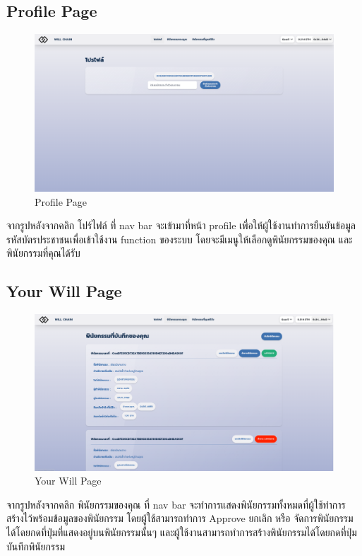 \documentclass[12pt,oneside,openright,a4paper]{cpe-thai-project}
\begin{document}
\subsection{Profile Page}
	\begin{figure}[!thb]
			\centering
			\includegraphics[scale=0.2]{Profile4}
			\caption{Profile Page}
		\end{figure}
		\FloatBarrier
\tab จากรูปหลังจากคลิก โปร์ไฟล์ ที่ nav bar จะเข้ามาที่หน้า profile เพื่อให้ผู้ใช้งานทำการยืนยันข้อมูลรหัสบัตรประชาชนเพื่อเข้าใช้งาน function ของระบบ โดยจะมีเมนูให้เลือกดูพินัยกรรมของคุณ และ พินัยกรรมที่คุณได้รับ
\subsection{Your Will Page }
	\begin{figure}[!thb]
			\centering
			\includegraphics[scale=0.2]{myWill4}
			\caption{Your Will Page}
		\end{figure}
		\FloatBarrier
\tab จากรูปหลังจากคลิก พินัยกรรมของคุณ ที่ nav bar จะทำการแสดงพินัยกรรมทั้งหมดที่ผู้ใช้ทำการสร้างไว้พร้อมข้อมูลของพินัยกรรม โดยผู้ใช้สามารถทำการ Approve ยกเลิก หรือ จัดการพินัยกรรมได้โดยกดที่ปุ่มที่แสดงอยู่บนพินัยกรรมนั้นๆ และผู้ใช้งานสามารถทำการสร้างพินัยกรรมได้โดยกดที่ปุ่ม บันทึกพินัยกรรม
\end{document}

